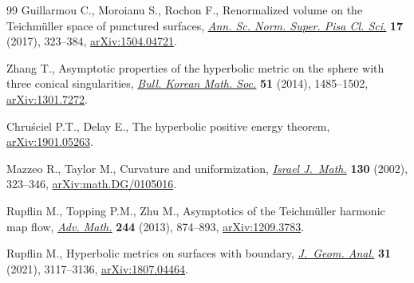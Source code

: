 \documentclass[10pt,a4paper]{article}
\numberwithin{equation}{section}
\begin{document}
\begin{thebibliography}{99}
Guillarmou C., Moroianu S., Rochon F., Renormalized volume on the
 {T}eichm\"uller space of punctured surfaces, \href{https://doi.org/10.2422/2036-2145.201506_002}{\textit{Ann. Sc. Norm. Super.
 Pisa Cl. Sci.}} \textbf{17} (2017), 323--384, \href{https://arxiv.org/abs/1504.04721}{arXiv:1504.04721}.


Zhang T., Asymptotic properties of the hyperbolic metric on the sphere with
 three conical singularities, \href{https://doi.org/10.4134/BKMS.2014.51.5.1485}{\textit{Bull. Korean Math. Soc.}} \textbf{51}
 (2014), 1485--1502, \href{https://arxiv.org/abs/1301.7272}{arXiv:1301.7272}.


Chru\'sciel P.T., Delay E., The hyperbolic positive energy theorem,
 \href{https://arxiv.org/abs/}{arXiv:1901.05263}.


Mazzeo R., Taylor M., Curvature and uniformization, \href{https://doi.org/10.1007/BF02764082}{\textit{Israel J.~Math.}}
 \textbf{130} (2002), 323--346, \href{https://arxiv.org/abs/math.DG/0105016}{arXiv:math.DG/0105016}.


Rupflin M., Topping P.M., Zhu M., Asymptotics of the {T}eichm\"uller harmonic
 map flow, \href{https://doi.org/10.1016/j.aim.2013.05.021}{\textit{Adv. Math.}} \textbf{244} (2013), 874--893,
 \href{https://arxiv.org/abs/1209.3783}{arXiv:1209.3783}.


Rupflin M., Hyperbolic metrics on surfaces with boundary, \href{https://doi.org/10.1007/s12220-020-00386-2}{\textit{J.~Geom.
 Anal.}} \textbf{31} (2021), 3117--3136, \href{https://arxiv.org/abs/1807.04464}{arXiv:1807.04464}.

\end{thebibliography}
\end{document}
